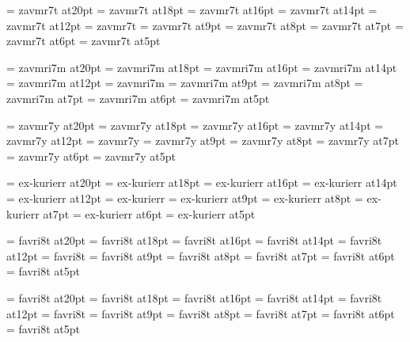 
\font\twentyrm=     zavmr7t at20pt
\font\eighteenrm=   zavmr7t at18pt
\font\sixteenrm=    zavmr7t at16pt
\font\fourteenrm=   zavmr7t at14pt
\font\twelverm=     zavmr7t at12pt
\font\tenrm=        zavmr7t %
\font\ninerm=       zavmr7t at9pt
\font\eightrm=      zavmr7t at8pt
\font\sevenrm=      zavmr7t at7pt
\font\sixrm=        zavmr7t at6pt
\font\fiverm=       zavmr7t at5pt

\font\twentyi=      zavmri7m at20pt
\font\eighteeni=    zavmri7m at18pt
\font\sixteeni=     zavmri7m at16pt
\font\fourteeni=    zavmri7m at14pt
\font\twelvei=      zavmri7m at12pt
\font\teni=         zavmri7m
\font\ninei=        zavmri7m at9pt
\font\eighti=       zavmri7m at8pt
\font\seveni=       zavmri7m at7pt
\font\sixi=         zavmri7m at6pt
\font\fivei=        zavmri7m at5pt

\font\twentysy=     zavmr7y at20pt
\font\eighteensy=   zavmr7y at18pt
\font\sixteensy=    zavmr7y at16pt
\font\fourteensy=   zavmr7y at14pt
\font\twelvesy=     zavmr7y at12pt
\font\tensy=        zavmr7y
\font\ninesy=       zavmr7y at9pt
\font\eightsy=      zavmr7y at8pt
\font\sevensy=      zavmr7y at7pt
\font\sixsy=        zavmr7y at6pt
\font\fivesy=       zavmr7y at5pt

\font\twentyex=     ex-kurierr at20pt
\font\eighteenex=   ex-kurierr at18pt
\font\sixteenex=    ex-kurierr at16pt
\font\fourteenex=   ex-kurierr at14pt
\font\twelveex=     ex-kurierr at12pt
\font\tenex=        ex-kurierr
\font\nineex=       ex-kurierr at9pt
\font\eightex=      ex-kurierr at8pt
\font\sevenex=      ex-kurierr at7pt
\font\sixex=        ex-kurierr at6pt
\font\fiveex=       ex-kurierr at5pt

\font\twentyit=     favri8t at20pt
\font\eighteenit=   favri8t at18pt
\font\sixteenit=    favri8t at16pt
\font\fourteenit=   favri8t at14pt
\font\twelveit=     favri8t at12pt
\font\tenit=        favri8t
\font\nineit=       favri8t at9pt
\font\eightit=      favri8t at8pt
\font\sevenit=      favri8t at7pt
\font\sixit=        favri8t at6pt
\font\fiveit=       favri8t at5pt

\font\twentysl=     favri8t at20pt
\font\eighteensl=   favri8t at18pt
\font\sixteensl=    favri8t at16pt
\font\fourteensl=   favri8t at14pt
\font\twelvesl=     favri8t at12pt
\font\tensl=        favri8t
\font\ninesl=       favri8t at9pt
\font\eightsl=      favri8t at8pt
\font\sevensl=      favri8t at7pt
\font\sixsl=        favri8t at6pt
\font\fivesl=       favri8t at5pt

